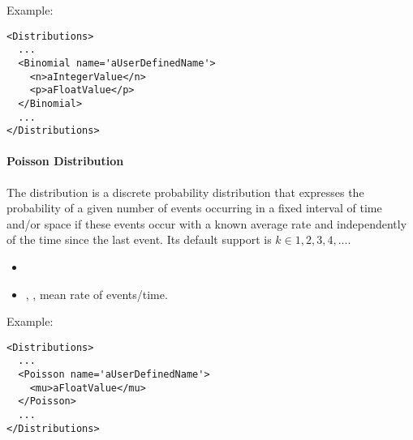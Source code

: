 Example:
\begin{lstlisting}[style=XML]
<Distributions>
  ...
  <Binomial name='aUserDefinedName'>
    <n>aIntegerValue</n>
    <p>aFloatValue</p>
  </Binomial>
  ...
</Distributions>
\end{lstlisting}

\paragraph{Poisson Distribution}
\label{Poisson}
The  distribution is a discrete probability distribution that
expresses the probability of a given number of events occurring in a fixed
interval of time and/or space if these events occur with a known average rate
and independently of the time since the last event.
%
Its default support is $k \in {1, 2, 3, 4, ...}$.

%
\attrIntro
\vspace{-5mm}
\begin{itemize}
  \itemsep0em
  \item \nameDescription
\end{itemize}
\vspace{-5mm}
\subnodeIntro
\begin{itemize}
  \item {}, , mean rate of
  events/time.
\end{itemize}

Example:
\begin{lstlisting}[style=XML]
<Distributions>
  ...
  <Poisson name='aUserDefinedName'>
    <mu>aFloatValue</mu>
  </Poisson>
  ...
</Distributions>
\end{lstlisting}


